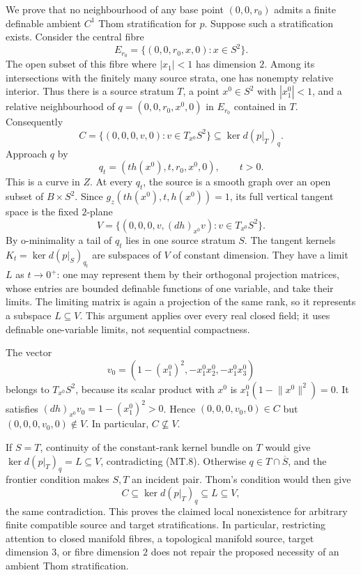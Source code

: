 We prove that no neighbourhood of any base point $(0,0,r_0)$
admits a finite definable ambient $C^1$ Thom stratification for $p$.
Suppose such a stratification exists. Consider the central fibre
\[
 E_{r_0}=\{(0,0,r_0,x,0):x\in S^2\}.
\]
The open subset of this fibre where $|x_1|<1$ has dimension $2$.
Among its intersections with the finitely many source strata,
one has nonempty relative interior. Thus there is a source stratum
$T$, a point $x^0\in S^2$ with $|x^0_1|<1$, and a relative
neighbourhood of
$q=(0,0,r_0,x^0,0)$ in $E_{r_0}$ contained in $T$. Consequently
\[
 C=\{(0,0,0,v,0):v\in T_{x^0}S^2\}
       \subseteq\ker d(p|_T)_q.
 \tag{MT.8}
\]
Approach $q$ by
\[
 q_t=(t h(x^0),t,r_0,x^0,0),\qquad t>0.
 \tag{MT.9}
\]
This is a curve in $Z$. At every $q_t$, the source is a smooth
graph over an open subset of $B\times S^2$. Since
$g_z(t h(x^0),t,h(x^0))=1$, its full vertical tangent space is
the fixed $2$-plane
\[
 V=\{(0,0,0,v,(dh)_{x^0}v):v\in T_{x^0}S^2\}.
 \tag{MT.10}
\]
By o-minimality a tail of $q_t$ lies in one source stratum $S$.
The tangent kernels $K_t=\ker d(p|_S)_{q_t}$ are subspaces of
$V$ of constant dimension. They have a limit $L$ as $t\to0^+$:
one may represent them by their orthogonal projection matrices,
whose entries are bounded definable functions of one variable,
and take their limits. The limiting matrix is again a projection
of the same rank, so it represents a subspace $L\subseteq V$.
This argument applies over every real closed field; it uses
definable one-variable limits, not sequential compactness.

The vector
\[
 v_0=(1-(x^0_1)^2,-x^0_1x^0_2,-x^0_1x^0_3)
\]
belongs to $T_{x^0}S^2$, because its scalar product with $x^0$
is $x^0_1(1-\lVert x^0\rVert^2)=0$. It satisfies
$(dh)_{x^0}v_0=1-(x^0_1)^2>0$. Hence
$(0,0,0,v_0,0)\in C$ but $(0,0,0,v_0,0)\notin V$.
In particular, $C\not\subseteq V$.

If $S=T$, continuity of the constant-rank kernel bundle on $T$
would give $\ker d(p|_T)_q=L\subseteq V$, contradicting
(MT.8). Otherwise $q\in T\cap\overline S$, and the frontier
condition makes $S,T$ an incident pair. Thom's condition would
then give
\[
 C\subseteq\ker d(p|_T)_q\subseteq L\subseteq V,
\]
the same contradiction. This proves the claimed local
nonexistence for arbitrary finite compatible source and target
stratifications. In particular, restricting attention to closed
manifold fibres, a topological manifold source, target dimension
$3$, or fibre dimension $2$ does not repair the proposed
necessity of an ambient Thom stratification.

